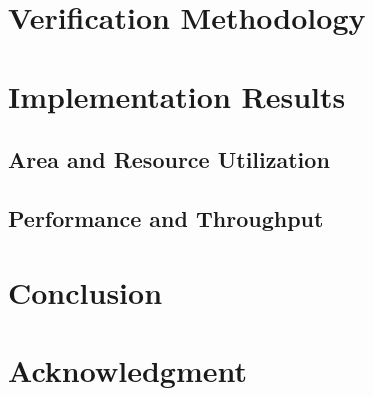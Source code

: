 \documentclass[conference]{IEEEtran}
\begin{document}
\section{Verification Methodology}

\section{Implementation Results}
\subsection{Area and Resource Utilization}

\subsection{Performance and Throughput}

\section{Conclusion}

\section*{Acknowledgment}


\end{document}
